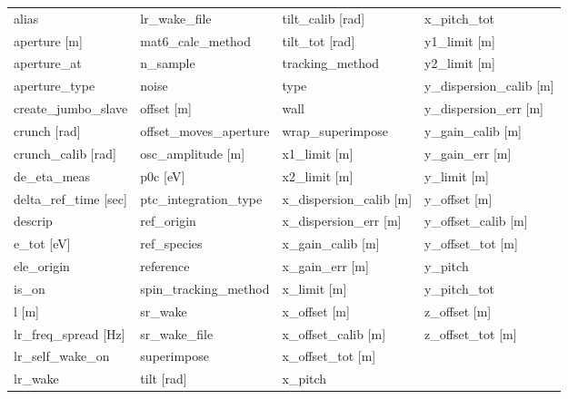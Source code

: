  \begin{tabular}{llll} \toprule
alias                            & lr_wake_file                     & tilt_calib [rad]                 & x_pitch_tot                      \\
aperture [m]                     & mat6_calc_method                 & tilt_tot [rad]                   & y1_limit [m]                     \\
aperture_at                      & n_sample                         & tracking_method                  & y2_limit [m]                     \\
aperture_type                    & noise                            & type                             & y_dispersion_calib [m]           \\
create_jumbo_slave               & offset [m]                       & wall                             & y_dispersion_err [m]             \\
crunch [rad]                     & offset_moves_aperture            & wrap_superimpose                 & y_gain_calib [m]                 \\
crunch_calib [rad]               & osc_amplitude [m]                & x1_limit [m]                     & y_gain_err [m]                   \\
de_eta_meas                      & p0c [eV]                         & x2_limit [m]                     & y_limit [m]                      \\
delta_ref_time [sec]             & ptc_integration_type             & x_dispersion_calib [m]           & y_offset [m]                     \\
descrip                          & ref_origin                       & x_dispersion_err [m]             & y_offset_calib [m]               \\
e_tot [eV]                       & ref_species                      & x_gain_calib [m]                 & y_offset_tot [m]                 \\
ele_origin                       & reference                        & x_gain_err [m]                   & y_pitch                          \\
is_on                            & spin_tracking_method             & x_limit [m]                      & y_pitch_tot                      \\
l [m]                            & sr_wake                          & x_offset [m]                     & z_offset [m]                     \\
lr_freq_spread [Hz]              & sr_wake_file                     & x_offset_calib [m]               & z_offset_tot [m]                 \\
lr_self_wake_on                  & superimpose                      & x_offset_tot [m]                 &                                  \\
lr_wake                          & tilt [rad]                       & x_pitch                          &                                  \\
 \bottomrule
 \end{tabular}
 \vfill
 
